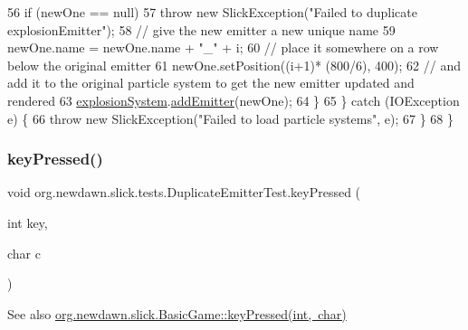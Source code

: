 \begin{DoxyCode}
56                 \textcolor{keywordflow}{if} (newOne == null)
57                     \textcolor{keywordflow}{throw} \textcolor{keyword}{new} SlickException(\textcolor{stringliteral}{"Failed to duplicate explosionEmitter"});
58                 \textcolor{comment}{// give the new emitter a new unique name}
59                 newOne.name = newOne.name + \textcolor{stringliteral}{"\_"} + i;
60                 \textcolor{comment}{// place it somewhere on a row below the original emitter}
61                 newOne.setPosition((i+1)* (800/6), 400);
62                 \textcolor{comment}{// and add it to the original particle system to get the new emitter updated and rendered}
63                 \mbox{\hyperlink{classorg_1_1newdawn_1_1slick_1_1tests_1_1_duplicate_emitter_test_ad51ae06362283e4a70164d3be38c3ae6}{explosionSystem}}.\mbox{\hyperlink{classorg_1_1newdawn_1_1slick_1_1particles_1_1_particle_system_abeb4a1cb7f8677cf28b82f1e49f1f0ce}{addEmitter}}(newOne);
64             \}
65         \} \textcolor{keywordflow}{catch} (IOException e) \{
66             \textcolor{keywordflow}{throw} \textcolor{keyword}{new} SlickException(\textcolor{stringliteral}{"Failed to load particle systems"}, e);
67         \}
68     \}
\end{DoxyCode}
\mbox{\label{classorg_1_1newdawn_1_1slick_1_1tests_1_1_duplicate_emitter_test_a99df8ebb859d8d2454cc3210bc44c91e}} 
\subsubsection{\texorpdfstring{key\+Pressed()}{keyPressed()}}
{\footnotesize\ttfamily void org.\+newdawn.\+slick.\+tests.\+Duplicate\+Emitter\+Test.\+key\+Pressed (\begin{DoxyParamCaption}\item[{int}]{key,  }\item[{char}]{c }\end{DoxyParamCaption})\hspace{0.3cm}{\ttfamily [inline]}}

\begin{DoxySeeAlso}{See also}
\mbox{\hyperlink{classorg_1_1newdawn_1_1slick_1_1_basic_game_a4fbb3345b5abf5ddd54a99466d07f02f}{org.\+newdawn.\+slick.\+Basic\+Game\+::key\+Pressed(int, char)}} 
\end{DoxySeeAlso}


